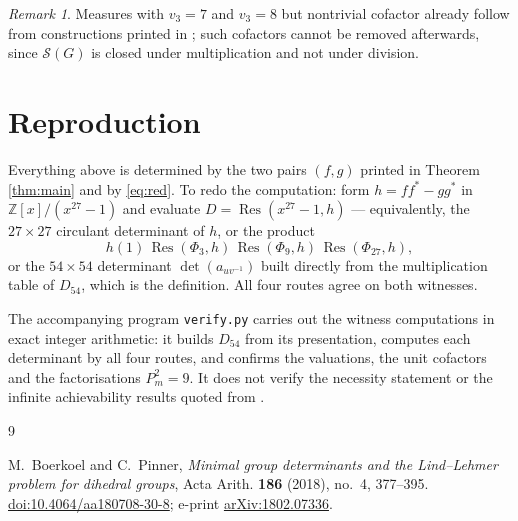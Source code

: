 \documentclass[11pt]{amsart}
\theoremstyle{remark}
\newtheorem*{remark}{Remark}
\DeclareMathOperator{\Res}{Res}
\newcommand{\ZZ}{\mathbb Z}
\newcommand{\Sset}{\mathcal S}
\begin{document}
\begin{remark}
Measures with $v_3=7$ and $v_3=8$ but
nontrivial cofactor already follow from constructions printed in \cite{BP};
such cofactors cannot be removed afterwards, since $\Sset(G)$ is closed under
multiplication and not under division.
\end{remark}

\section{Reproduction}

Everything above is determined by the two pairs $(f,g)$ printed in Theorem
\ref{thm:main} and by \eqref{eq:red}. To redo the computation: form
$h=ff^*-gg^*$ in $\ZZ[x]/(x^{27}-1)$ and evaluate $D=\Res(x^{27}-1,h)$ ---
equivalently, the $27\times27$ circulant determinant of $h$, or the product
\[
 h(1)\,\Res(\Phi_3,h)\,\Res(\Phi_9,h)\,\Res(\Phi_{27},h),
\]
or the $54\times54$ determinant $\det(a_{uv^{-1}})$ built directly from the
multiplication table of $D_{54}$, which is the definition. All four routes agree
on both witnesses.

The accompanying program \texttt{verify.py} carries out the witness computations
in exact integer arithmetic: it builds $D_{54}$ from its presentation, computes
each determinant by all four routes, and confirms the valuations, the unit
cofactors and the factorisations $P_m^2=9$. It does not verify the necessity
statement or the infinite achievability results quoted from \cite{BP}.

\begin{thebibliography}{9}

M.~Boerkoel and C.~Pinner,
\emph{Minimal group determinants and the Lind--Lehmer problem for dihedral
groups},
Acta Arith. \textbf{186} (2018), no.~4, 377--395.
\href{https://doi.org/10.4064/aa180708-30-8}{doi:10.4064/aa180708-30-8};
e-print \href{https://arxiv.org/abs/1802.07336}{arXiv:1802.07336}.

\end{thebibliography}
\end{document}
